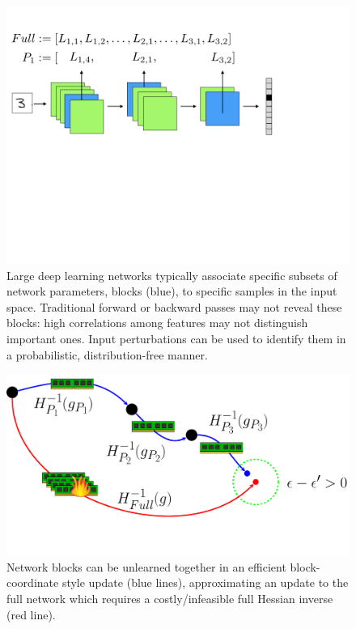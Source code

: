 \begin{figure}
    \centering
    \includegraphics[width=\columnwidth,trim={0cm 12cm 5cm 2.5cm},clip]{5_unlearn/figs/layercnn.png}
    \caption[Conditionally independent network subsets]{\label{fig:main1} Large deep learning networks typically associate specific subsets of network parameters, blocks (blue), to specific samples in the input space.
    Traditional forward or backward passes may not reveal these blocks: high correlations among features may not distinguish important ones. Input perturbations can be used to identify them in a probabilistic, distribution-free manner.}
\end{figure}
\begin{figure}
	\centering
	\includegraphics[width=\columnwidth,trim={0cm 1cm 0cm 0cm},clip]{5_unlearn/figs/unlearning_fig.pdf}
	\caption[Efficient unlearning]{\label{fig:main2}Network blocks can be unlearned together in an efficient block-coordinate style update (blue lines), approximating an update to the full network which requires a costly/infeasible full Hessian inverse (red line).}
\end{figure}

